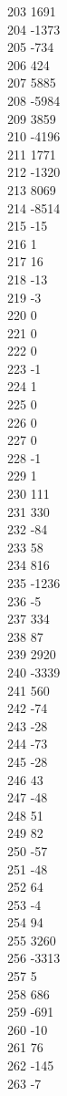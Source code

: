 { 203	1691 \\
 204	-1373 \\
 205	-734 \\
 206	424 \\
 207	5885 \\
 208	-5984 \\
 209	3859 \\
 210	-4196 \\
 211	1771 \\
 212	-1320 \\
 213	8069 \\
 214	-8514 \\
 215	-15 \\
 216	1 \\
 217	16 \\
 218	-13 \\
 219	-3 \\
 220	0 \\
 221	0 \\
 222	0 \\
 223	-1 \\
 224	1 \\
 225	0 \\
 226	0 \\
 227	0 \\
 228	-1 \\
 229	1 \\
 230	111 \\
 231	330 \\
 232	-84 \\
 233	58 \\
 234	816 \\
 235	-1236 \\
 236	-5 \\
 237	334 \\
 238	87 \\
 239	2920 \\
 240	-3339 \\
 241	560 \\
 242	-74 \\
 243	-28 \\
 244	-73 \\
 245	-28 \\
 246	43 \\
 247	-48 \\
 248	51 \\
 249	82 \\
 250	-57 \\
 251	-48 \\
 252	64 \\
 253	-4 \\
 254	94 \\
 255	3260 \\
 256	-3313 \\
 257	5 \\
 258	686 \\
 259	-691 \\
 260	-10 \\
 261	76 \\
 262	-145 \\
 263	-7 \\
}
